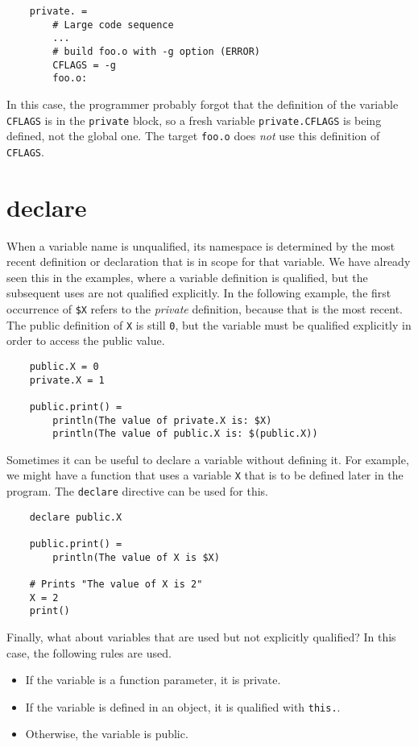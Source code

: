 \begin{verbatim}
    private. =
        # Large code sequence
        ...
        # build foo.o with -g option (ERROR)
        CFLAGS = -g
        foo.o:
\end{verbatim}
%
In this case, the programmer probably forgot that the definition of the variable \verb+CFLAGS+ is in
the \verb+private+ block, so a fresh variable \verb+private.CFLAGS+ is being defined, not the global
one.  The target \verb+foo.o+ does \emph{not} use this definition of \verb+CFLAGS+.

\section{declare}
\label{section:declare}

When a variable name is unqualified, its namespace is determined by the most recent definition or
declaration that is in scope for that variable.  We have already seen this in the examples, where a
variable definition is qualified, but the subsequent uses are not qualified explicitly.  In the
following example, the first occurrence of \verb+$X+ refers to the \emph{private} definition,
because that is the most recent.  The public definition of \verb+X+ is still \verb+0+, but the
variable must be qualified explicitly in order to access the public value.

\begin{verbatim}
    public.X = 0
    private.X = 1

    public.print() =
        println(The value of private.X is: $X)
        println(The value of public.X is: $(public.X))
\end{verbatim}
%
Sometimes it can be useful to declare a variable without defining it.  For example, we might have a
function that uses a variable \verb+X+ that is to be defined later in the program.  The
\verb+declare+ directive can be used for this.

\begin{verbatim}
    declare public.X

    public.print() =
        println(The value of X is $X)

    # Prints "The value of X is 2"
    X = 2
    print()
\end{verbatim}

Finally, what about variables that are used but not explicitly qualified?  In this case, the following rules are used.

\begin{itemize}
\item If the variable is a function parameter, it is private.
\item If the variable is defined in an object, it is qualified with \verb+this.+.
\item Otherwise, the variable is public.
\end{itemize}

